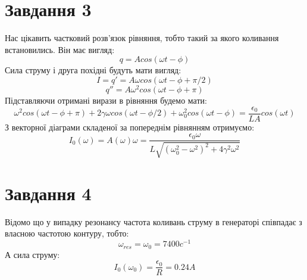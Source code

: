 \documentclass[a4paper,12pt]{article}
\begin{document}
\section*{Завдання 3}
\hspace*{\parindent}Нас цікавить частковий розв'язок рівняння, тобто такий за якого коливання встановились. Він має вигляд:
\[ q = Acos(\omega t -\phi) \]
\hspace*{\parindent}Сила струму і друга похідні будуть мати вигляд:
\[ I = q' = A\omega cos(\omega t -\phi + \pi /2) \]
\[ q'' = A\omega^2 cos(\omega t -\phi + \pi ) \]
\hspace*{\parindent}Підставляючи отримані вирази в рівняння будемо мати:
\[ \omega^2 cos(\omega t - \phi + \pi ) + 2\gamma \omega cos(\omega t - \phi /2 ) + \omega_0^2 cos(\omega t - \phi) = \dfrac{\epsilon_0}{LA}cos(\omega t) \]
\hspace*{\parindent}З векторної діаграми складеної за попереднім рівнянням отримуємо:
\[ I_{0}(\omega) = A(\omega)\omega = \frac{\epsilon_{0}\omega}{L\sqrt{(\omega_{0}^2 - \omega^2)^2 + 4\gamma^2\omega^2}} \]
\section*{Завдання 4}
\hspace*{\parindent}Відомо що у випадку резонансу частота коливань струму в генераторі співпадає з власною частотою контуру, тобто: 
\[ \omega_{res} = \omega_0 = 7400c^{-1} \]
\hspace*{\parindent}А сила струму: \[ I_0(\omega_0) = \dfrac{\epsilon_0}{R} = 0.24 A\]
\end{document}
